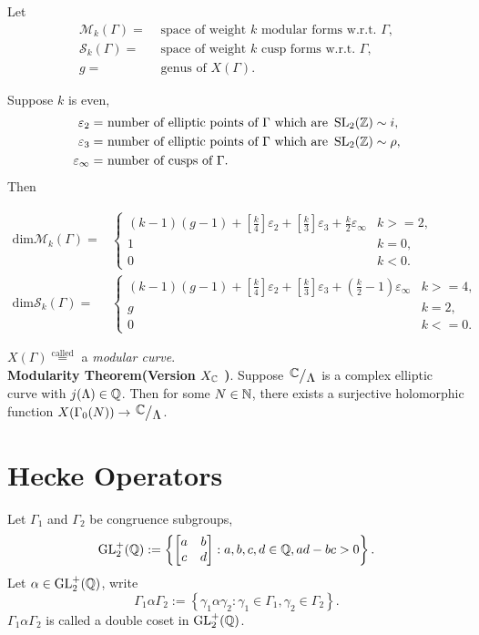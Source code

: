 Let 
\begin{align*}
  \mathcal{M}_k(\Gamma)=&\text{ space of weight }k  \text{ modular forms w.r.t. }\Gamma,\\
  \mathcal{S}_k(\Gamma)=&\text{ space of weight }k \text{ cusp forms w.r.t. }\Gamma,\\
  g=&\text{ genus of }X(\Gamma)
.\end{align*}
\begin{theorem}
  Suppose $k$ is even,
  \begin{align*}
    \varepsilon _2=& \text{ number of elliptic points of }\Gamma \text{ which are }\operatorname{SL}_2(\mathbb{Z})\sim i,\\
    \varepsilon_3=& \text{ number of elliptic points of }\Gamma \text{ which are }\operatorname{SL}_2(\mathbb{Z})\sim\rho,\\
    \varepsilon _{\infty}=& \text{ number of cusps of }\Gamma
  .\end{align*}
  Then

  \begin{align*}
    \mathrm{dim}\mathcal{M}_k(\Gamma)=&\begin{cases}
      (k-1)(g-1)+\left[ \frac{k}{4} \right] \varepsilon_2+\left[ \frac{k}{3} \right] \varepsilon _3+\frac{k}{2}\varepsilon _{\infty} & k>=2,\\
      1&k=0,\\
      0&k<0.
    \end{cases}\\
      \mathrm{dim}\mathcal{S}_k(\Gamma)=& \begin{cases}
	(k-1)(g-1)+\left[ \frac{k}{4} \right] \varepsilon _2+\left[ \frac{k}{3} \right] \varepsilon _3+\left( \frac{k}{2}-1 \right) \varepsilon _{\infty}&k>=4,\\
	g&k=2,\\
	0&k<=0.
      \end{cases}
  \end{align*}
\end{theorem}

$X(\Gamma)\overset{\text{called}}{=}$ a \textit{modular curve}.\\
\textbf{Modularity Theorem(Version $X_{\mathbb{C}}$ )}. Suppose $\sfrac{\C}{\Lambda}$ is a complex elliptic curve with $j(\Lambda)\in \mathbb{Q}$. Then for some $N \in \mathbb{N}$, there exists a surjective holomorphic function $X(\Gamma_0(N))\to \sfrac{\C}{\Lambda}$.

\section{Hecke Operators}
Let $\Gamma_1$ and $\Gamma_2$ be congruence subgroups,
\[
  \operatorname{GL}_2^{+}(\mathbb{Q}):=\left\{\begin{bmatrix} a&b\\c&d \end{bmatrix} :a,b,c,d\in \mathbb{Q},ad-bc>0\right\}.	
\] 
Let $\alpha \in \operatorname{GL}_2^{+}(\mathbb{Q})$, write 
\[
\Gamma_1\alpha\Gamma_2:=\left\{\gamma_1\alpha\gamma_2:\gamma_1\in \Gamma_1,\gamma_2\in \Gamma_2\right\}. 
\] 
$\Gamma_1\alpha\Gamma_2$ is called a double coset in $\operatorname{GL}_2^{+}(\mathbb{Q})$.

